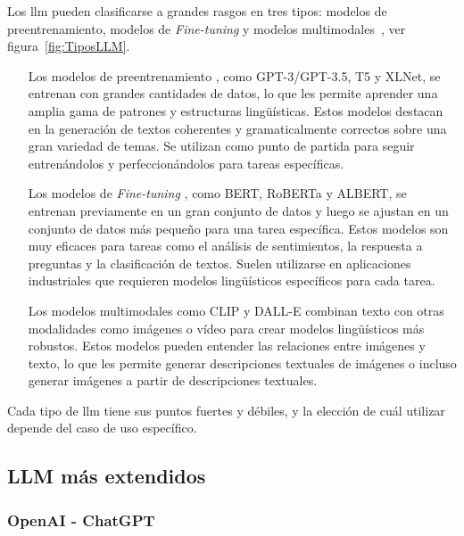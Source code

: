 Los \acrlong{llm} pueden clasificarse a grandes rasgos en tres tipos: modelos de preentrenamiento, modelos de \textit{Fine-tuning} y modelos multimodales~\cite{scribbleData}, ver figura~\ref{fig:TiposLLM}.

\begin{itemize}

\item[Los modelos de preentrenamiento], como GPT-3/GPT-3.5, T5 y XLNet, se entrenan con grandes cantidades de datos, lo que les permite aprender una amplia gama de patrones y estructuras lingüísticas. Estos modelos destacan en la generación de textos coherentes y gramaticalmente correctos sobre una gran variedad de temas. Se utilizan como punto de partida para seguir entrenándolos y perfeccionándolos para tareas específicas.

\item[Los modelos de \textit{Fine-tuning}], como BERT, RoBERTa y ALBERT, se entrenan previamente en un gran conjunto de datos y luego se ajustan en un conjunto de datos más pequeño para una tarea específica. Estos modelos son muy eficaces para tareas como el análisis de sentimientos, la respuesta a preguntas y la clasificación de textos. Suelen utilizarse en aplicaciones industriales que requieren modelos lingüísticos específicos para cada tarea.

\item[Los modelos multimodales] como CLIP y DALL-E combinan texto con otras modalidades como imágenes o vídeo para crear modelos lingüísticos más robustos. Estos modelos pueden entender las relaciones entre imágenes y texto, lo que les permite generar descripciones textuales de imágenes o incluso generar imágenes a partir de descripciones textuales.

\end{itemize}

Cada tipo de \acrshort{llm} tiene sus puntos fuertes y débiles, y la elección de cuál utilizar depende del caso de uso específico.


\subsection{LLM más extendidos}

\subsubsection{OpenAI - ChatGPT} \label{openai}

